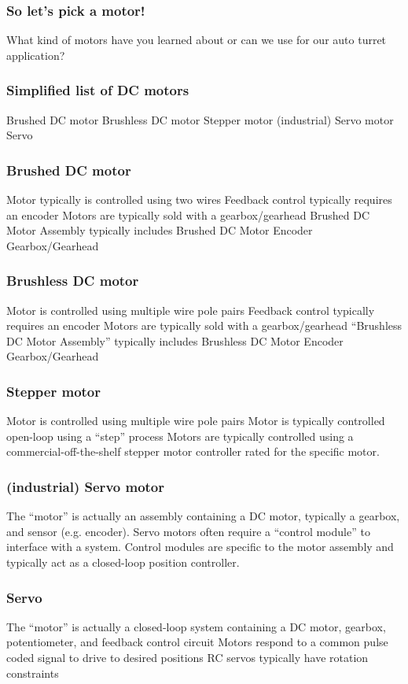 \documentclass[aspectratio=169]{beamer}
\begin{document}
\begin{frame}
\frametitle{So let's pick a motor!}
What kind of motors have you learned about or can we use for our auto turret application?
\end{frame}

\begin{frame}
\frametitle{Simplified list of DC motors}
Brushed DC motor
Brushless DC motor
Stepper motor
(industrial) Servo motor
Servo
\end{frame}

\begin{frame}
\frametitle{Brushed DC motor}
Motor typically is controlled using two wires
Feedback control typically requires an encoder
Motors are typically sold with a gearbox/gearhead
Brushed DC Motor Assembly typically includes
Brushed DC Motor
Encoder
Gearbox/Gearhead
\end{frame}

\begin{frame}
\frametitle{Brushless DC motor}
Motor is controlled using multiple wire pole pairs
Feedback control typically requires an encoder
Motors are typically sold with a gearbox/gearhead
``Brushless DC Motor Assembly'' typically includes
Brushless DC Motor
Encoder
Gearbox/Gearhead
\end{frame}

\begin{frame}
\frametitle{Stepper motor}
Motor is controlled using multiple wire pole pairs
Motor is typically controlled open-loop using a ``step'' process
Motors are typically controlled using a commercial-off-the-shelf stepper motor controller rated for the specific motor.
\end{frame}

\begin{frame}
\frametitle{(industrial) Servo motor}
The ``motor'' is actually an assembly containing a DC motor, typically a gearbox, and sensor (e.g. encoder).
Servo motors often require a ``control module'' to interface with a system.
Control modules are specific to the motor assembly and typically act as a closed-loop position controller.
\end{frame}

\begin{frame}
\frametitle{Servo}
The ``motor'' is actually a closed-loop system containing a DC motor, gearbox, potentiometer, and feedback control circuit
Motors respond to a common pulse coded signal to drive to desired positions
RC servos typically have rotation constraints
\end{frame}
\end{document}
